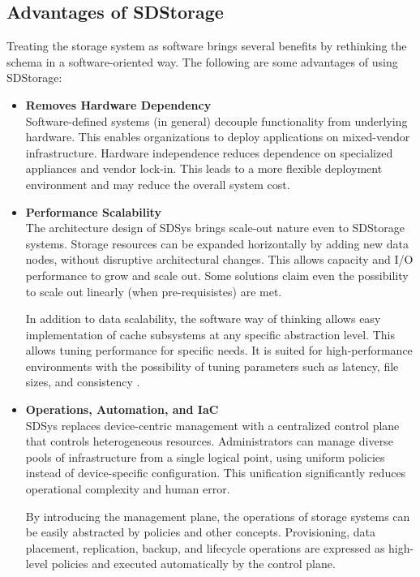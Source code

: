 \subsection{Advantages of SDStorage}
Treating the storage system as software brings several benefits by rethinking the schema in a software-oriented way. The following are some advantages of using SDStorage:

\begin{itemize}
    \item \textbf{Removes Hardware Dependency} \\
    Software-defined systems (in general) decouple functionality from underlying hardware. This enables organizations to deploy applications on mixed-vendor infrastructure. Hardware independence reduces dependence on specialized appliances and vendor lock-in. This leads to a more flexible deployment environment and may reduce the overall system cost. \cite{faisal_software-defined_2024}
    
    \item \textbf{Performance Scalability} \\
    The architecture design of SDSys brings scale-out nature even to SDStorage systems. Storage resources can be expanded horizontally by adding new data nodes, without disruptive architectural changes. This allows capacity and I/O performance to grow and scale out. Some solutions claim even the possibility to scale out linearly (when pre-requisistes) are met. \cite{parkes_cephio_2025}

    In addition to data scalability, the software way of thinking allows easy implementation of cache subsystems at any specific abstraction level. This allows tuning performance for specific needs. It is suited for high-performance environments with the possibility of tuning parameters such as latency, file sizes, and consistency \cite{faisal_software-defined_2024}.
    
    \item \textbf{Operations, Automation, and IaC} \\
    SDSys replaces device-centric management with a centralized control plane that controls heterogeneous resources. Administrators can manage diverse pools of infrastructure from a single logical point, using uniform policies instead of device-specific configuration. This unification significantly reduces operational complexity and human error.

    By introducing the management plane, the operations of storage systems can be easily abstracted by policies and other concepts. Provisioning, data placement, replication, backup, and lifecycle operations are expressed as high-level policies and executed automatically by the control plane.
    

\end{itemize}
